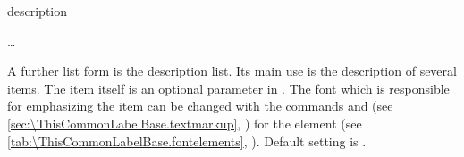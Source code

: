   \begin{Declaration}
    \begin{Environment}{description}
      \begin{Body}
         \dots
        \BodyDots
      \end{Body}
    \end{Environment}
  \end{Declaration}%
  A further list form is the description list. Its main use is the description
  of several items. The item itself is an optional parameter in
  . %
  The font%
  which is responsible for emphasizing the item can be changed with the
  commands  and
   (see
  \autoref{sec:\ThisCommonLabelBase.textmarkup},
  ) for the element
   (see
  \autoref{tab:\ThisCommonLabelBase.fontelements},
  ). Default setting is
  \linebreak[1].%
